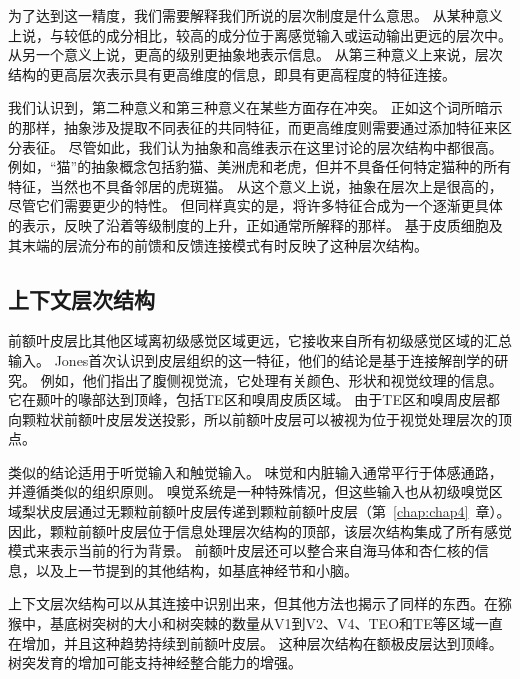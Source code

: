 为了达到这一精度，我们需要解释我们所说的层次制度是什么意思。
从某种意义上说，与较低的成分相比，较高的成分位于离感觉输入或运动输出更远的层次中。
从另一个意义上说，更高的级别更抽象地表示信息。
从第三种意义上来说，层次结构的更高层次表示具有更高维度的信息，即具有更高程度的特征连接。
\par


我们认识到，第二种意义和第三种意义在某些方面存在冲突。
正如这个词所暗示的那样，抽象涉及提取不同表征的共同特征，而更高维度则需要通过添加特征来区分表征。
尽管如此，我们认为抽象和高维表示在这里讨论的层次结构中都很高。
例如，“猫”的抽象概念包括豹猫、美洲虎和老虎，但并不具备任何特定猫种的所有特征，当然也不具备邻居的虎斑猫。
从这个意义上说，抽象在层次上是很高的，尽管它们需要更少的特性。
但同样真实的是，将许多特征合成为一个逐渐更具体的表示，反映了沿着等级制度的上升，正如通常所解释的那样。
基于皮质细胞及其末端的层流分布的前馈和反馈连接模式有时反映了这种层次结构\cite{rockland2000feedback}。



\subsection{上下文层次结构}
\par
前额叶皮层比其他区域离初级感觉区域更远，它接收来自所有初级感觉区域的汇总输入。
Jones首次认识到皮层组织的这一特征，他们的结论是基于连接解剖学的研究\cite{jones1970anatomical}。
例如，他们指出了腹侧视觉流，它处理有关颜色、形状和视觉纹理的信息。
它在颞叶的喙部达到顶峰，包括TE区和嗅周皮质区域。
由于TE区\cite{webster1994connections}和嗅周皮层\cite{petrides2002association}都向颗粒状前额叶皮层发送投影，所以前额叶皮层可以被视为位于视觉处理层次的顶点\cite{young1992objective}。
\par


类似的结论适用于听觉输入\cite{romanski2009primate}和触觉输入\cite{jones1970anatomical}。
味觉和内脏输入通常平行于体感通路，并遵循类似的组织原则。
嗅觉系统是一种特殊情况，但这些输入也从初级嗅觉区域梨状皮层通过无颗粒前额叶皮层传递到颗粒前额叶皮层（第~\ref{chap:chap4}~章）。
因此，颗粒前额叶皮层位于信息处理层次结构的顶部，该层次结构集成了所有感觉模式来表示当前的行为背景。
前额叶皮层还可以整合来自海马体和杏仁核的信息，以及上一节提到的其他结构，如基底神经节和小脑。
\par


上下文层次结构可以从其连接中识别出来，但其他方法也揭示了同样的东西。在猕猴中，基底树突树的大小和树突棘的数量从V1到V2、V4、TEO和TE等区域一直在增加，并且这种趋势持续到前额叶皮层\cite{elston2007specialization}。
这种层次结构在额极皮层达到顶峰。
树突发育的增加可能支持神经整合能力的增强。
\par


